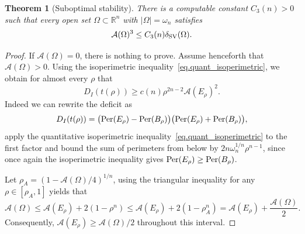 \documentclass[11pt]{amsart}
\newcommand{\theoname}{Theorem}
\theoremstyle{plain}
\newtheorem{theorem}{\theoname}[section]
\theoremstyle{definition}
\newcommand\Per{\mathop{\rm Per}}
\newcommand\SV{\mathop{\rm SV}}
\begin{document}
\begin{theorem}[Suboptimal stability]\label{thm:suboptimal_stabilitySV}
There is a computable constant $C_3(n)>0$ such that every open set
$\Omega\subset\mathbb R^n$ with $|\Omega|=\omega_n$ satisfies
\begin{equation}
   \mathcal{A}(\Omega)^3\le C_3(n)\delta_{\SV}(\Omega).
\end{equation}
\end{theorem}
\begin{proof}
If $\mathcal A(\Omega)=0$, there is nothing to prove. Assume henceforth that
$\mathcal A(\Omega)>0$. Using the isoperimetric inequality~\eqref{eq.quant_isoperimetric}, we obtain for almost every $\rho$ that
\begin{equation}\label{eq:DI-lower}
 D_I(t(\rho))
 \ge c(n)\rho^{2n-2}\mathcal{A}(E_\rho)^2.
\end{equation}
Indeed we can rewrite the deficit as
  \[
  D_I(t(\rho))
 =\bigl(\Per(E_\rho)-\Per(B_\rho)\bigr)
  \bigl(\Per(E_\rho)+\Per(B_\rho)\bigr),
  \]
apply the quantitative isoperimetric inequality~\eqref{eq.quant_isoperimetric} to the first factor and bound the sum of perimeters from below by $2n\omega_n^{1/n}\rho^{n-1}$, since once again the isoperimetric inequality gives $\Per(E_\rho) \ge \Per(B_\rho)$. 

Let $\rho_A=(1-\mathcal{A}(\Omega)/4)^{1/n}$, using the triangular inequality for any
$\rho\in[\rho_A,1]$ yields that
\[
 \mathcal{A}(\Omega)\le \mathcal{A}(E_\rho)+2(1-\rho^n)
   \le \mathcal{A}(E_\rho)+2(1-\rho_A^n)
   =\mathcal{A}(E_\rho)+\frac{\mathcal{A}(\Omega)}{2}.
\]
Consequently, $\mathcal{A}(E_\rho)\ge \mathcal{A}(\Omega)/2$ throughout this interval.



\end{proof}
\end{document}
